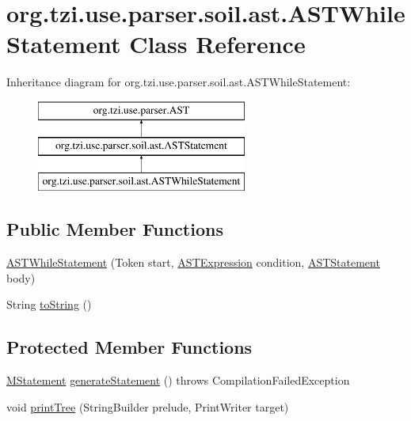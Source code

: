 \hypertarget{classorg_1_1tzi_1_1use_1_1parser_1_1soil_1_1ast_1_1_a_s_t_while_statement}{\section{org.\-tzi.\-use.\-parser.\-soil.\-ast.\-A\-S\-T\-While\-Statement Class Reference}
\label{classorg_1_1tzi_1_1use_1_1parser_1_1soil_1_1ast_1_1_a_s_t_while_statement}
}
Inheritance diagram for org.\-tzi.\-use.\-parser.\-soil.\-ast.\-A\-S\-T\-While\-Statement\-:\begin{figure}[H]
\begin{center}
\leavevmode
\includegraphics[height=3.000000cm]{classorg_1_1tzi_1_1use_1_1parser_1_1soil_1_1ast_1_1_a_s_t_while_statement}
\end{center}
\end{figure}
\subsection*{Public Member Functions}
\begin{DoxyCompactItemize}
\item 
\hyperlink{classorg_1_1tzi_1_1use_1_1parser_1_1soil_1_1ast_1_1_a_s_t_while_statement_a03d0873fcfaccc7f25d1a6062448d12c}{A\-S\-T\-While\-Statement} (Token start, \hyperlink{classorg_1_1tzi_1_1use_1_1parser_1_1ocl_1_1_a_s_t_expression}{A\-S\-T\-Expression} condition, \hyperlink{classorg_1_1tzi_1_1use_1_1parser_1_1soil_1_1ast_1_1_a_s_t_statement}{A\-S\-T\-Statement} body)
\item 
String \hyperlink{classorg_1_1tzi_1_1use_1_1parser_1_1soil_1_1ast_1_1_a_s_t_while_statement_a94bf4444602655b52b4002ea47705383}{to\-String} ()
\end{DoxyCompactItemize}
\subsection*{Protected Member Functions}
\begin{DoxyCompactItemize}
\item 
\hyperlink{classorg_1_1tzi_1_1use_1_1uml_1_1sys_1_1soil_1_1_m_statement}{M\-Statement} \hyperlink{classorg_1_1tzi_1_1use_1_1parser_1_1soil_1_1ast_1_1_a_s_t_while_statement_a661e9cbe6480b02d2a2f99355368d875}{generate\-Statement} ()  throws Compilation\-Failed\-Exception 
\item 
void \hyperlink{classorg_1_1tzi_1_1use_1_1parser_1_1soil_1_1ast_1_1_a_s_t_while_statement_ae37092247a5e1c007dd50047ba02132a}{print\-Tree} (String\-Builder prelude, Print\-Writer target)
\end{DoxyCompactItemize}
